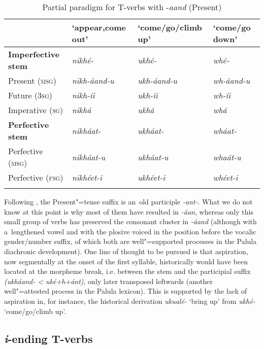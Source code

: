 \begin{table}[ht]
\caption{Partial paradigm for T-verbs with -\textit{aand} (Present)}
\begin{tabularx}{\textwidth}{ l Q Q Q }
\lsptoprule
&
`appear,\newline come out' &
`come/go/\newline climb up' &
`come/go down'\\\hline
\textbf{Imperfective stem} &
\textit{nikhé- } &
\textit{ukhé-} &
\textit{whé-} \\
Present (\textsc{msg}) &
\textit{nikh-áand-u} &
\textit{ukh-áand-u} &
\textit{wh-áand-u} \\
Future (\textsc{3sg}) &
\textit{nikh-íi} &
\textit{ukh-íi} &
\textit{wh-íi} \\
Imperative (\textsc{sg}) &
\textit{nikhá} &
\textit{ukhá} &
\textit{whá} \\
\textbf{Perfective stem} &
\textit{nikháat-} &
\textit{ukháat-} &
\textit{wháat-} \\
Perfective (\textsc{msg}) &
\textit{nikháat-u} &
\textit{ukháat-u} &
\textit{whaát-u} \\
Perfective (\textsc{fsg}) &
\textit{nikhéet-i} &
\textit{ukhéet-i} &
\textit{whéet-i} \\\lspbottomrule
\end{tabularx}
\label{tab:8-10}
\end{table}


Following \citet[22]{morgenstierne1941}, the Present"=tense suffix is an~old participle \textit{-ant-}. What we do not know at this point is why most of them have resulted in \textit{-áan}, whereas only this small group of verbs has preserved the consonant cluster in \textit{-áand} (although with a~lengthened vowel and with the plosive voiced in the position before the vocalic gender/number suffix, of which both are well"=supported processes in the Palula diachronic development). One line of thought to be pursued is that aspiration, now segmentally at the onset of the first syllable, historically would have been located at the morpheme break, i.e. between the stem and the participial suffix \textit{(ukháand- {\textless} uké+h+ánt)}, only later transposed leftwards (another well"=attested process in the Palula lexicon). This is supported by the lack of aspiration in, for instance, the historical derivation \textit{ukualé-} `bring up' from \textit{ukhé-} `come/go/climb up'.


\subsection{\textit{i}-ending T-verbs}
\label{subsec:8-3-9}


